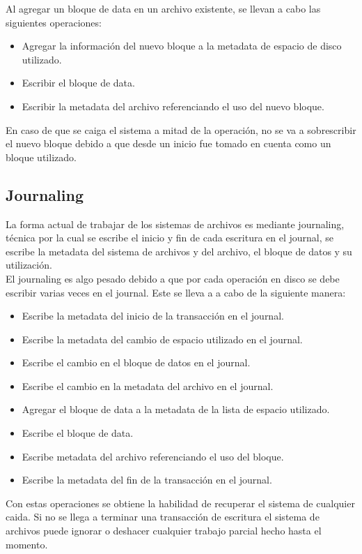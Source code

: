 Al agregar un bloque de data en un archivo existente, se llevan a cabo las siguientes operaciones:

\begin{itemize}
\item Agregar la información del nuevo bloque a la metadata de espacio de disco utilizado.
\item Escribir el bloque de data.
\item Escribir la metadata del archivo referenciando el uso del nuevo bloque.
\end{itemize}

En caso de que se caiga el sistema a mitad de la operación, no se va a sobrescribir el nuevo bloque debido a que desde un inicio fue tomado en cuenta como un bloque utilizado.

\subsection{Journaling}

La forma actual de trabajar de los sistemas de archivos es mediante journaling, técnica por la cual se escribe el inicio y fin de cada escritura en el journal, se escribe la metadata del sistema de archivos y del archivo, el bloque de datos y su utilización.\\

El journaling es algo pesado debido a que por cada operación en disco se debe escribir varias veces en el journal. Este se lleva a a cabo de la siguiente manera:

\begin{itemize}
\item Escribe la metadata del inicio de la transacción en el journal.
\item Escribe la metadata del cambio de espacio utilizado en el journal.
\item Escribe el cambio en el bloque de datos en el journal.
\item Escribe el cambio en la metadata del archivo en el journal.
\item Agregar el bloque de data a la metadata de la lista de espacio utilizado.
\item Escribe el bloque de data.
\item Escribe metadata del archivo referenciando el uso del bloque.
\item Escribe la metadata del fin de la transacción en el journal.
\end{itemize}

Con estas operaciones se obtiene la habilidad de recuperar el sistema de cualquier caida. Si no se llega a terminar una transacción de escritura el sistema de archivos puede ignorar o deshacer cualquier trabajo parcial hecho hasta el momento.\\

